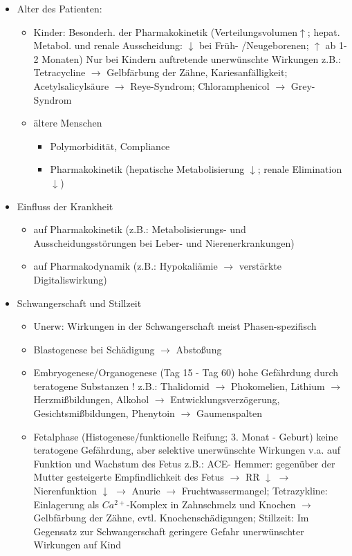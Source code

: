 \documentclass[10pt,a4paper]{report}
\begin{document}
\begin{itemize}
	\item Alter des Patienten: 
	\begin{itemize}
		\item Kinder: Besonderh. der Pharmakokinetik (Verteilungsvolumen$\uparrow$; hepat. Metabol. und renale Ausscheidung: $\downarrow$ bei Früh- /Neugeborenen; $\uparrow$ ab 1-2 Monaten) Nur bei Kindern auftretende unerwünschte Wirkungen	z.B.: Tetracycline $\rightarrow$ Gelbfärbung der Zähne, Kariesanfälligkeit;	Acetylsalicylsäure $\rightarrow$ Reye-Syndrom; Chloramphenicol $\rightarrow$ Grey-Syndrom
		\item ältere Menschen
		\begin{itemize}
			\item Polymorbidität, Compliance
			\item Pharmakokinetik (hepatische Metabolisierung $\downarrow$; renale Elimination $\downarrow$)
		\end{itemize}
	\end{itemize}	 
	\item Einfluss der Krankheit
	\begin{itemize}
		\item auf Pharmakokinetik (z.B.: Metabolisierungs- und Ausscheidungsstörungen 
		bei Leber- und Nierenerkrankungen)
		\item auf Pharmakodynamik (z.B.: Hypokaliämie $\rightarrow$ verstärkte Digitaliswirkung)
	\end{itemize}
	\item Schwangerschaft und Stillzeit
	\begin{itemize}
		\item Unerw: Wirkungen in der Schwangerschaft meist Phasen-spezifisch
		\item Blastogenese  bei Schädigung $\rightarrow$ Abstoßung
		\item Embryogenese/Organogenese (Tag 15 - Tag 60) hohe Gefährdung durch teratogene Substanzen ! z.B.: Thalidomid $\rightarrow$ Phokomelien, Lithium $\rightarrow$ Herzmißbildungen, Alkohol $\rightarrow$ Entwicklungsverzögerung, Gesichtsmißbildungen,	Phenytoin $\rightarrow$ Gaumenspalten
		\item Fetalphase (Histogenese/funktionelle Reifung; 3. Monat - Geburt) keine teratogene Gefährdung, aber selektive unerwünschte Wirkungen v.a. auf Funktion und Wachstum des Fetus z.B.: 	ACE- Hemmer: gegenüber der Mutter gesteigerte Empfindlichkeit des Fetus $\rightarrow$ RR $\downarrow$ $\rightarrow$ Nierenfunktion $\downarrow$ $\rightarrow$ Anurie $\rightarrow$ Fruchtwassermangel; Tetrazykline: Einlagerung als $Ca^{2+}$-Komplex in Zahnschmelz und Knochen $\rightarrow$ Gelbfärbung der Zähne, evtl. Knochenschädigungen; Stillzeit: Im Gegensatz zur Schwangerschaft geringere Gefahr unerwünschter Wirkungen auf Kind

\end{itemize}
\end{itemize}
\end{document}
